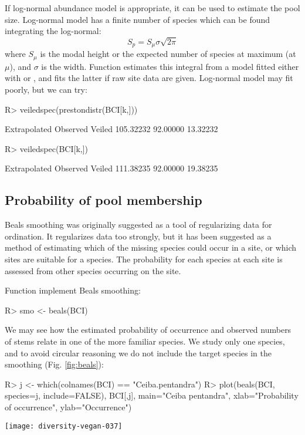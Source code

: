 \documentclass[article,nojss]{jss}
\begin{document}
If log-normal abundance model is appropriate, it can be used to
estimate the pool size.  Log-normal model has a finite number of
species which can be found integrating the log-normal:
\begin{equation}
S_p = S_\mu \sigma \sqrt{2 \pi}
\end{equation}
where $S_\mu$ is the modal height or the expected number of species at
maximum (at $\mu$), and $\sigma$ is the width.  Function
 estimates this integral from a model fitted either
with  or , and fits the latter
if raw site data are given.  Log-normal model may fit poorly, but we
can try:
\begin{Schunk}
\begin{Sinput}
R> veiledspec(prestondistr(BCI[k,]))
\end{Sinput}
\begin{Soutput}
Extrapolated     Observed       Veiled 
   105.32232     92.00000     13.32232 
\end{Soutput}
\begin{Sinput}
R> veiledspec(BCI[k,])
\end{Sinput}
\begin{Soutput}
Extrapolated     Observed       Veiled 
   111.38235     92.00000     19.38235 
\end{Soutput}
\end{Schunk}

\subsection{Probability of pool membership}

Beals smoothing was originally suggested as a tool of regularizing data
for ordination.  It regularizes data too strongly,
but it has been suggested as a method of estimating which of the
missing species could occur in a site, or which sites are suitable for
a species.  The probability for each species at each site is assessed
from other species occurring on the site.

Function  implement Beals smoothing:
\begin{Schunk}
\begin{Sinput}
R> smo <- beals(BCI)
\end{Sinput}
\end{Schunk}
We may see how the estimated probability of occurrence and observed
numbers of stems relate in one of the more familiar species. We study
only one species, and to avoid circular reasoning we do not include
the target species in the smoothing (Fig. \ref{fig:beals}):
\begin{Schunk}
\begin{Sinput}
R> j <- which(colnames(BCI) == "Ceiba.pentandra")
R> plot(beals(BCI, species=j, include=FALSE), BCI[,j], main="Ceiba pentandra", xlab="Probability of occurrence", ylab="Occurrence")
\end{Sinput}
\end{Schunk}
\begin{SCfigure}
\texttt{[image: diversity-vegan-037]}
\caption{Beals smoothing for \emph{Ceiba pentandra}.}
\label{fig:beals}
\end{SCfigure}
\end{document}
